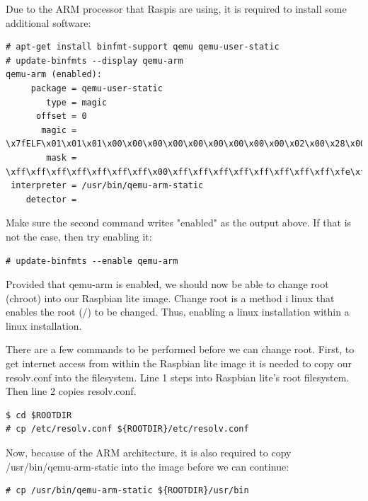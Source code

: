 Due to the \ac{ARM} processor that \ac{Raspi}s are using, it is required to
install some additional software:

\begin{lstlisting}[]
# apt-get install binfmt-support qemu qemu-user-static
# update-binfmts --display qemu-arm
qemu-arm (enabled):
     package = qemu-user-static
        type = magic
      offset = 0
       magic = \x7fELF\x01\x01\x01\x00\x00\x00\x00\x00\x00\x00\x00\x00\x02\x00\x28\x00
        mask = \xff\xff\xff\xff\xff\xff\xff\x00\xff\xff\xff\xff\xff\xff\xff\xff\xfe\xff\xff\xff
 interpreter = /usr/bin/qemu-arm-static
    detector = 
\end{lstlisting}
\FloatBarrier
\vspace{-5mm}

Make sure the second command writes "enabled" as the output above. If that 
is not the case, then try enabling it:

\begin{lstlisting}[]
# update-binfmts --enable qemu-arm
\end{lstlisting}
\FloatBarrier
\vspace{-5mm}

Provided that qemu-arm is enabled, we should now be able to change root (chroot)
into our Raspbian lite image. Change root is a method i linux that enables
the root (/) to be changed. Thus, enabling a linux installation within a
linux installation.

There are a few commands to be performed before we can change root.
First, to get internet access from within the Raspbian lite image it is needed
to copy our resolv.conf into the filesystem. Line 1 steps into Raspbian lite's
root filesystem. Then line 2 copies resolv.conf.

\begin{lstlisting}[]
$ cd $ROOTDIR
# cp /etc/resolv.conf ${ROOTDIR}/etc/resolv.conf
\end{lstlisting}
\FloatBarrier
\vspace{-5mm}

Now, because of the ARM architecture, it is also required to copy
/usr/bin/qemu-arm-static into the image before we can continue:

\begin{lstlisting}[]
# cp /usr/bin/qemu-arm-static ${ROOTDIR}/usr/bin
\end{lstlisting}
\FloatBarrier
\vspace{-5mm}

